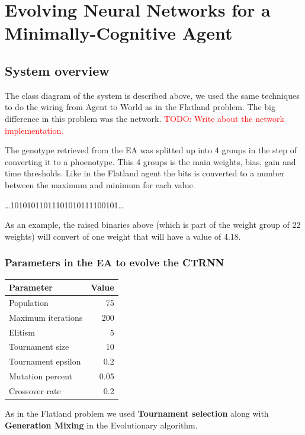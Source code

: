 \section{Evolving Neural Networks for a Minimally-Cognitive Agent}
\subsection{System overview}
The class diagram of the system is described above, we used the same techniques to do the wiring from Agent to World as in the Flatland problem. The big difference in this problem was the network. \textcolor{red}{TODO: Write about the network implementation.}


The genotype retrieved from the EA was splitted up into 4 groups in the step of converting it to a phoenotype. This 4 groups is the main weights, bias, gain and time thresholds. Like in the Flatland agent the bits is converted to a number between the maximum and minimum for each value.

\begin{center}
\dots101010110{\LARGE11101010}111100101\dots
\end{center}

As an example, the raised binaries above (which is part of the weight group of 22 weights) will convert of one weight that will have a value of 4.18.

\subsubsection{Parameters in the EA to evolve the CTRNN}
\begin{center}
\begin{tabular}{p{5cm} | r}
\textbf{Parameter} & \textbf{Value} \\
\hline
Population & 75 \\
Maximum iterations & 200 \\
Elitism & 5 \\
Tournament size & 10 \\
Tournament epsilon & 0.2 \\
Mutation percent & 0.05 \\
Crossover rate & 0.2 \\
\hline
\end{tabular}
\end{center}

As in the Flatland problem we used \textbf{Tournament selection} along with \textbf{Generation Mixing} in the Evolutionary algorithm.

